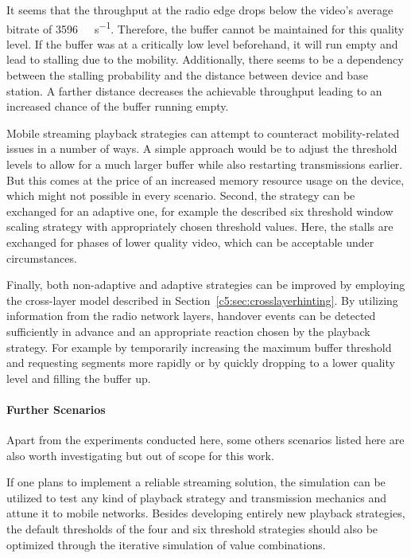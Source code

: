 It seems that the throughput at the radio edge drops below the video's average bitrate of \SI{3596}{\kilo\bit\per\second}. Therefore, the buffer cannot be maintained for this quality level. If the buffer was at a critically low level beforehand, it will run empty and lead to stalling due to the mobility. Additionally, there seems to be a dependency between the stalling probability and the distance between device and base station. A farther distance decreases the achievable throughput leading to an increased chance of the buffer running empty.

Mobile streaming playback strategies can attempt to counteract mobility-related issues in a number of ways. A simple approach would be to adjust the threshold levels to allow for a much larger buffer while also restarting transmissions earlier. But this comes at the price of an increased memory resource usage on the device, which might not possible in every scenario. Second, the strategy can be exchanged for an adaptive one, for example the described six threshold window scaling strategy with appropriately chosen threshold values. Here, the stalls are exchanged for phases of lower quality video, which can be acceptable under circumstances. 

Finally, both non-adaptive and adaptive strategies can be improved by employing the cross-layer model described in Section~\ref{c5:sec:crosslayerhinting}. By utilizing information from the radio network layers, handover events can be detected sufficiently in advance and an appropriate reaction chosen by the playback strategy. For example by temporarily increasing the maximum buffer threshold and requesting segments more rapidly or by quickly dropping to a lower quality level and filling the buffer up.

\paragraph{Further Scenarios}

Apart from the experiments conducted here, some others scenarios listed here are also worth investigating but out of scope for this work.

If one plans to implement a reliable streaming solution, the simulation can be utilized to test any kind of playback strategy and transmission mechanics and attune it to mobile networks. Besides developing entirely new playback strategies, the default thresholds of the four and six threshold strategies should also be optimized through the iterative simulation of value combinations.


